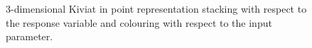 \begin{figure}[!ht]               
\centering
{}
       
\caption{3-dimensional Kiviat in point representation stacking with respect to the response variable and colouring with respect to the input parameter.}
 \label{fig:mesh}
\end{figure}



